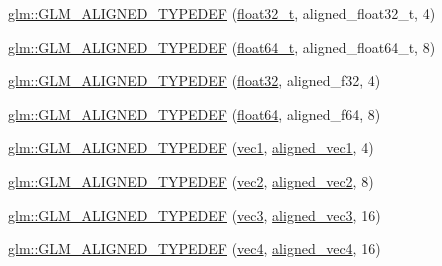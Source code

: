 \begin{DoxyCompactItemize}
\item 
\mbox{\hyperlink{group__gtx__type__aligned_gada9b0bea273d3ae0286f891533b9568f}{glm\+::\+G\+L\+M\+\_\+\+A\+L\+I\+G\+N\+E\+D\+\_\+\+T\+Y\+P\+E\+D\+EF}} (\mbox{\hyperlink{group__gtc__type__precision_ga642737ae3e7c434b366f2191e6944bf2}{float32\+\_\+t}}, aligned\+\_\+float32\+\_\+t, 4)
\item 
\mbox{\hyperlink{group__gtx__type__aligned_ga6e3a2d83b131336219a0f4c7cbba2a48}{glm\+::\+G\+L\+M\+\_\+\+A\+L\+I\+G\+N\+E\+D\+\_\+\+T\+Y\+P\+E\+D\+EF}} (\mbox{\hyperlink{group__gtc__type__precision_gade966a3eb25ebeb16dd53c40d3fdeb46}{float64\+\_\+t}}, aligned\+\_\+float64\+\_\+t, 8)
\item 
\mbox{\hyperlink{group__gtx__type__aligned_gadbce23b9f23d77bb3884e289a574ebd5}{glm\+::\+G\+L\+M\+\_\+\+A\+L\+I\+G\+N\+E\+D\+\_\+\+T\+Y\+P\+E\+D\+EF}} (\mbox{\hyperlink{group__gtc__type__precision_ga814f2f65354b6588b067cc5c67a6b340}{float32}}, aligned\+\_\+f32, 4)
\item 
\mbox{\hyperlink{group__gtx__type__aligned_gaa4deaa0dea930c393d55e7a4352b0a20}{glm\+::\+G\+L\+M\+\_\+\+A\+L\+I\+G\+N\+E\+D\+\_\+\+T\+Y\+P\+E\+D\+EF}} (\mbox{\hyperlink{group__gtc__type__precision_gab721f828b41f46b20cf4883b50733d3b}{float64}}, aligned\+\_\+f64, 8)
\item 
\mbox{\hyperlink{group__gtx__type__aligned_ga81bc497b2bfc6f80bab690c6ee28f0f9}{glm\+::\+G\+L\+M\+\_\+\+A\+L\+I\+G\+N\+E\+D\+\_\+\+T\+Y\+P\+E\+D\+EF}} (\mbox{\hyperlink{namespaceglm_a16030dae9029ed1eab1553a2183bbb79}{vec1}}, \mbox{\hyperlink{group__gtc__type__aligned_ga8cf75c112dfa39264b7ef65c2ed6b3c4}{aligned\+\_\+vec1}}, 4)
\item 
\mbox{\hyperlink{group__gtx__type__aligned_gada3e8f783e9d4b90006695a16c39d4d4}{glm\+::\+G\+L\+M\+\_\+\+A\+L\+I\+G\+N\+E\+D\+\_\+\+T\+Y\+P\+E\+D\+EF}} (\mbox{\hyperlink{group__core__types_gaa1618f51db67eaa145db101d8c8431d8}{vec2}}, \mbox{\hyperlink{group__gtc__type__aligned_ga8f4a38f220c72d218dbdc7bc1d06a1a2}{aligned\+\_\+vec2}}, 8)
\item 
\mbox{\hyperlink{group__gtx__type__aligned_gab8d081fac3a38d6f55fa552f32168d32}{glm\+::\+G\+L\+M\+\_\+\+A\+L\+I\+G\+N\+E\+D\+\_\+\+T\+Y\+P\+E\+D\+EF}} (\mbox{\hyperlink{group__core__types_ga1c47e8b3386109bc992b6c48e91b0be7}{vec3}}, \mbox{\hyperlink{group__gtc__type__aligned_ga9c54536a3becfd10a44f6b1b8c4aa3d3}{aligned\+\_\+vec3}}, 16)
\item 
\mbox{\hyperlink{group__gtx__type__aligned_ga12fe7b9769c964c5b48dcfd8b7f40198}{glm\+::\+G\+L\+M\+\_\+\+A\+L\+I\+G\+N\+E\+D\+\_\+\+T\+Y\+P\+E\+D\+EF}} (\mbox{\hyperlink{group__core__types_ga5881b1b022d7fd1b7218f5916532dd02}{vec4}}, \mbox{\hyperlink{group__gtc__type__aligned_gad26d520694d7b865507819c2d9f2b196}{aligned\+\_\+vec4}}, 16)

\end{DoxyCompactItemize}
